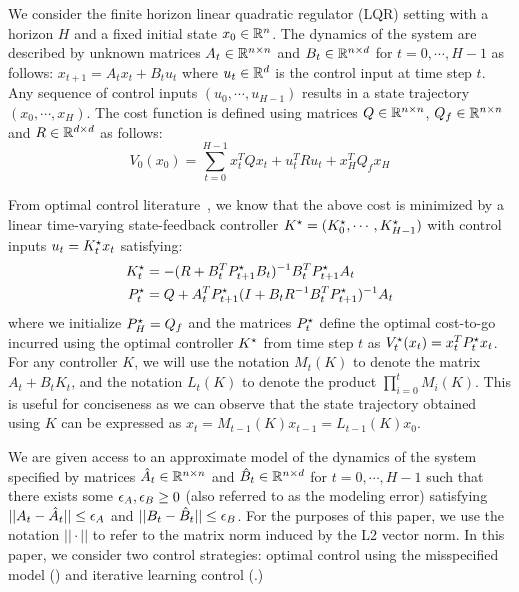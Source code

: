 We consider the finite horizon linear quadratic regulator (LQR) setting with a
horizon $H$ and a fixed initial state $x_{0} \in \mathbb{R}^{n}$. The dynamics of
the system are described by unknown matrices $A_{t} \in \mathbb{R}^{n\times n}$ and
$B_{t} \in \mathbb{R}^{n\times d}$ for $t=0, \cdots, H-1$ as follows:
$x_{t+1} = A_{t}x_{t} + B_{t}u_{t}$
where $u_{t} \in \mathbb{R}^{d}$ is the control input at time step $t$. Any sequence
of control inputs $(u_{0}, \cdots, u_{H-1})$ results in a state trajectory
$(x_{0}, \cdots, x_{H})$. The cost function is defined using matrices
$Q \in \mathbb{R}^{n\times n}$, $Q_{f} \in \mathbb{R}^{n\times n}$ and $R \in \mathbb{R}^{d \times d}$ as follows:
\begin{equation}
  \label{eq:7}
  V_{0}(x_{0}) = \sum_{t=0}^{H-1} x_{t}^{T}Qx_{t} + u_{t}^{T}Ru_{t} + x_{H}^{T}Q_{f}x_{H}
\end{equation}

From optimal control literature~\cite{anderson07}, we know that the above cost is minimized by
a linear time-varying state-feedback controller $K^\star = (K^\star_{0}, \cdots, K^\star_{H-1})$
with control inputs $u_{t} = K^\star_{t}x_{t}$ satisfying:
\begin{align*}
  K^\star_{t} &= -(R + B_{t}^{T}P^\star_{t+1}B_{t})^{-1}B_{t}^{T}P^\star_{t+1}A_{t} \\
  P^\star_{t} &= Q + A_{t}^{T}P^\star_{t+1}(I + B_{t}R^{-1}B_{t}^{T}P^\star_{t+1})^{-1}A_{t}
\end{align*}
where we initialize $P^\star_{H} = Q_{f}$ and the matrices $P^\star_{t}$ define the optimal
cost-to-go incurred using the optimal controller $K^\star$ from time step $t$ as
$V^\star_{t}(x_{t}) = x_{t}^{T}P^\star_{t}x_{t}$. For any controller $K$, we will
use the notation $M_{t}(K)$ to denote the matrix $A_{t} + B_{t}K_{t}$, and the
notation $L_{t}(K)$ to denote the product $\prod_{i=0}^{t}M_{i}(K)$. This is
useful for conciseness as we can observe that the state trajectory obtained
using $K$ can be expressed as $x_{t} = M_{t-1}(K)x_{t-1} = L_{t-1}(K)x_{0}$.

We are given access to an approximate model of the dynamics of the system
specified by matrices $\hat{A}_{t} \in \mathbb{R}^{n\times n}$ and
$\hat{B}_{t} \in \mathbb{R}^{n \times d}$ for $t = 0, \cdots, H-1$ such that there
exists some $\epsilon_A, \epsilon_B \geq 0$ (also referred to as the modeling error) satisfying
$||A_{t} - \hat{A}_{t}|| \leq \epsilon_A$ and $||B_{t} - \hat{B}_{t}|| \leq \epsilon_B$.
For the purposes of this paper, we use the notation $||\cdot||$ to refer to the
matrix norm induced by the L2 vector norm.
In this paper, we consider two control strategies: optimal control
using the misspecified model
(\MM{}) and iterative learning control (\ILC{}.)

